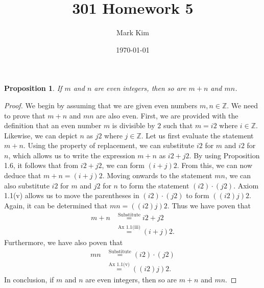 \documentclass[12pt]{amsart}
\title{301 Homework 5}
\author{Mark Kim}
\date{\today}
\newcommand{\Z}{\mathbb{Z}}
\newtheorem*{proposition}{Proposition}
\begin{document}
\maketitle

\begin{proposition}
If $m$ and $n$ are even integers, then so are $m+n$ and $mn$.
\end{proposition}

\begin{proof}
We begin by assuming that we are given even numbers $m,n\in\Z$.  We need to prove that $m+n$ and $mn$ are also even. First, we are provided with the definition that an even number $m$ is divisible by $2$ such that $m=i2$ where $i\in\Z$.  Likewise, we can depict $n$ as $j2$ where $j\in\Z$.  Let us first evaluate the statement $m+n$.  Using the property of replacement, we can substitute $i2$ for $m$ and $i2$ for $n$, which allows us to write the expression $m+n$ as $i2 + j2$.  By using Proposition 1.6, it follows that from $i2 + j2$, we can form $(i + j)2$.  From this, we can now deduce that $m+n=(i + j)2$.  Moving onwards to the statement $mn$,  we can also substitute $i2$ for $m$ and $j2$ for $n$ to form the statement $(i2)\cdot(j2)$.  Axiom 1.1(v) allows us to move the parentheses in $(i2)\cdot(j2)$ to form $((i2)j)2$.  Again, it can be determined that $mn=((i2)j)2$.  Thus we have poven that
\begin{align*}
m+n&\stackrel{\text{Substitute}}{=}i2 + j2\\
&\stackrel{\text{Ax 1.1(iii)}}{=}(i + j)2.
\end{align*}
Furthermore, we have also poven that
\begin{align*}
mn&\stackrel{\text{Substitute}}{=}(i2) \cdot (j2)\\
&\stackrel{\text{Ax 1.1(v)}}{=}((i2)j)2.
\end{align*}
In conclusion, if $m$ and $n$ are even integers, then so are $m+n$ and $mn$.
\end{proof}
\end{document}
